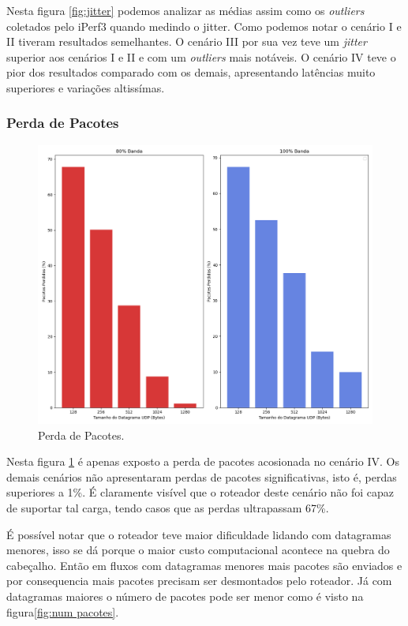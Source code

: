 Nesta figura \ref{fig:jitter} podemos analizar as médias assim como os \textit{outliers} coletados pelo iPerf3 quando medindo o jitter. Como podemos notar o cenário I e II tiveram resultados semelhantes. O cenário III por sua vez teve um \textit{jitter} superior aos cenários I e II e com um \textit{outliers} mais notáveis. O cenário IV teve o pior dos resultados comparado com os demais, apresentando latências muito superiores e variações altissímas.

\subsubsection{Perda de Pacotes}

\begin{figure}[H]
    \centering
    \includegraphics[width=0.9\linewidth]{sources/fig-pacotes-perdidos.png}
    \caption{Perda de Pacotes.}
    \label{fig:perda}
\end{figure}

Nesta figura \ref{fig:perda} é apenas exposto a perda de pacotes acosionada no cenário IV. Os demais cenários não apresentaram perdas de pacotes significativas, isto é, perdas superiores a 1\%. É claramente visível que o roteador deste cenário não foi capaz de suportar tal carga, tendo casos que as perdas ultrapassam 67\%. 

É possível notar que o roteador teve maior dificuldade lidando com datagramas menores, isso se dá porque o maior custo computacional acontece na quebra do cabeçalho. Então em fluxos com datagramas menores mais pacotes são enviados e por consequencia mais pacotes precisam ser desmontados pelo roteador. Já com datagramas maiores o número de pacotes pode ser menor como é visto na figura\ref{fig:num pacotes}.






